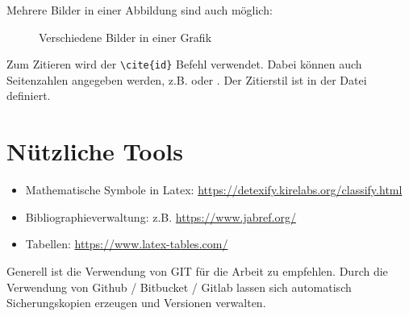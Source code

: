 

Mehrere Bilder in einer Abbildung sind auch möglich:

\begin{figure}[H]
	\centering
	\qquad
	\caption{Verschiedene Bilder in einer Grafik}%
\end{figure}

Zum Zitieren wird der \lstinline|\cite{id}| Befehl verwendet. Dabei können auch Seitenzahlen angegeben werden, z.B. \cite{Haffner2018} oder \cite[S. 15]{Haffner2018}. Der Zitierstil ist in der  Datei definiert.

\section{Nützliche Tools}

\begin{itemize}
	\item Mathematische Symbole in Latex: \newline\url{https://detexify.kirelabs.org/classify.html}
	\item Bibliographieverwaltung: z.B. \url{https://www.jabref.org/}
	\item Tabellen: \url{https://www.latex-tables.com/}
\end{itemize}

Generell ist die Verwendung von GIT für die Arbeit zu empfehlen. Durch die Verwendung von Github / Bitbucket / Gitlab lassen sich automatisch Sicherungskopien erzeugen und Versionen verwalten.